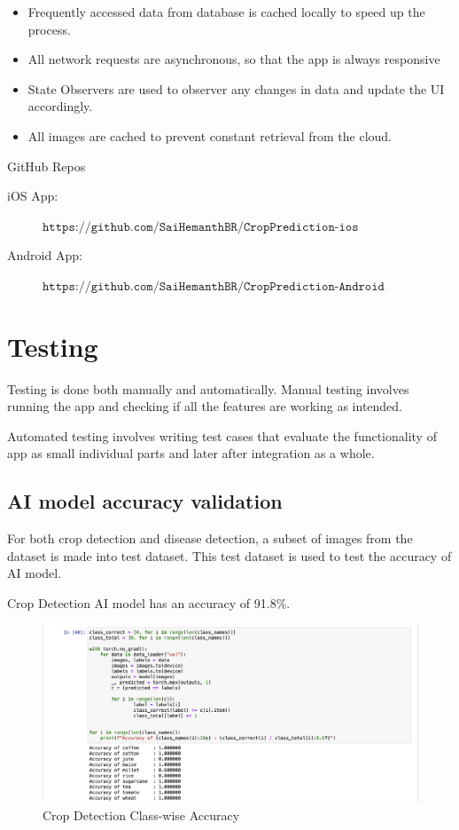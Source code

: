 \documentclass[../Report.tex]{subfiles}
\begin{document}
\begin{itemize}
  \item Frequently accessed data from database is cached locally to speed up the process.
  \item All network requests are asynchronous, so that the app is always responsive
  \item State Observers are used to observer any changes in data and update the UI accordingly.
  \item All images are cached to prevent constant retrieval from the cloud.
\end{itemize}

GitHub Repos
\begin{description}
  \item [iOS App:] $\texttt{https://github.com/SaiHemanthBR/CropPrediction-ios}$
  \item[Android App:] $\texttt{https://github.com/SaiHemanthBR/CropPrediction-Android}$
\end{description}

\section{Testing}

Testing is done both manually and automatically. Manual testing involves running the app and checking if all the features are working as 
intended.\par
Automated testing involves writing test cases that evaluate the functionality of app as small individual parts and later after integration 
as a whole.

\subsection{AI model accuracy validation} \label{sec:ai_testing}

For both crop detection and disease detection, a subset of images from the dataset is made into test dataset. This test dataset is used to 
test the accuracy of AI model.\par

Crop Detection AI model has an accuracy of 91.8\%.
\begin{figure}[H]
  \centering
  \includegraphics[width=\linewidth]{images/crop_class_acc.png}
  \caption{Crop Detection Class-wise Accuracy}
  \label{fig:test_ai_crop_class_acc}
\end{figure}\par
\end{document}
